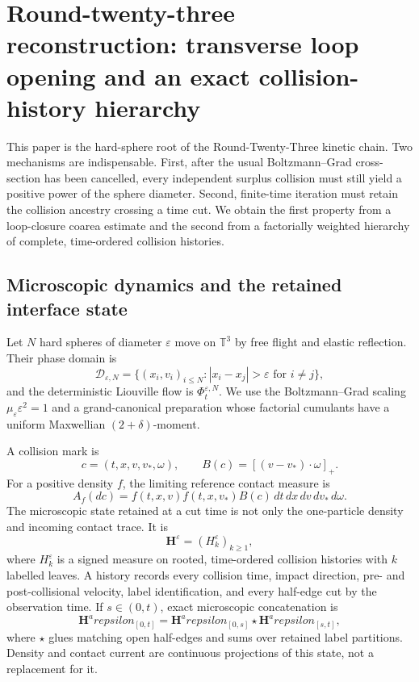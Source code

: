 \section{Round-twenty-three reconstruction: transverse loop opening and an exact collision-history hierarchy}
\label{sec:r23-b2}

This paper is the hard-sphere root of the Round-Twenty-Three kinetic chain.
Two mechanisms are indispensable.  First, after the usual Boltzmann--Grad
cross-section has been cancelled, every independent surplus collision must
still yield a positive power of the sphere diameter.  Second, finite-time
iteration must retain the collision ancestry crossing a time cut.  We obtain
the first property from a loop-closure coarea estimate and the second from a
factorially weighted hierarchy of complete, time-ordered collision histories.

\subsection{Microscopic dynamics and the retained interface state}

Let $N$ hard spheres of diameter $\varepsilon$ move on $\mathbb T^3$ by free
flight and elastic reflection.  Their phase domain is
\[
 \mathcal D_{\varepsilon,N}
 =\{(x_i,v_i)_{i\le N}:|x_i-x_j|>\varepsilon
                         \text{ for }i\ne j\},
\]
and the deterministic Liouville flow is
$\Phi_t^{\varepsilon,N}$.  We use the Boltzmann--Grad scaling
$\mu_\varepsilon\varepsilon^2=1$ and a grand-canonical preparation whose
factorial cumulants have a uniform Maxwellian $(2+\delta)$-moment.

A collision mark is
\[
 c=(t,x,v,v_*,\omega),\qquad
 B(c)=[(v-v_*)\cdot\omega]_+ .                            \tag{B2.1}
\]
For a positive density $f$, the limiting reference contact measure is
\[
 A_f(dc)=f(t,x,v)f(t,x,v_*)B(c)
          \,dt\,dx\,dv\,dv_*\,d\omega .                 \tag{B2.2}
\]
The microscopic state retained at a cut time is not only the one-particle
density and incoming contact trace.  It is
\[
 \mathbf H^\varepsilon=(H_k^\varepsilon)_{k\ge1},        \tag{B2.3}
\]
where $H_k^\varepsilon$ is a signed measure on rooted, time-ordered collision
histories with $k$ labelled leaves.  A history records every collision time,
impact direction, pre- and post-collisional velocity, label identification,
and every half-edge cut by the observation time.  If $s\in(0,t)$, exact
microscopic concatenation is
\[
 \mathbf H^arepsilon_{[0,t]}
 =\mathbf H^arepsilon_{[0,s]}\star
  \mathbf H^arepsilon_{[s,t]},                         \tag{B2.4}
\]
where $\star$ glues matching open half-edges and sums over retained label
partitions.  Density and contact current are continuous projections of this
state, not a replacement for it.

